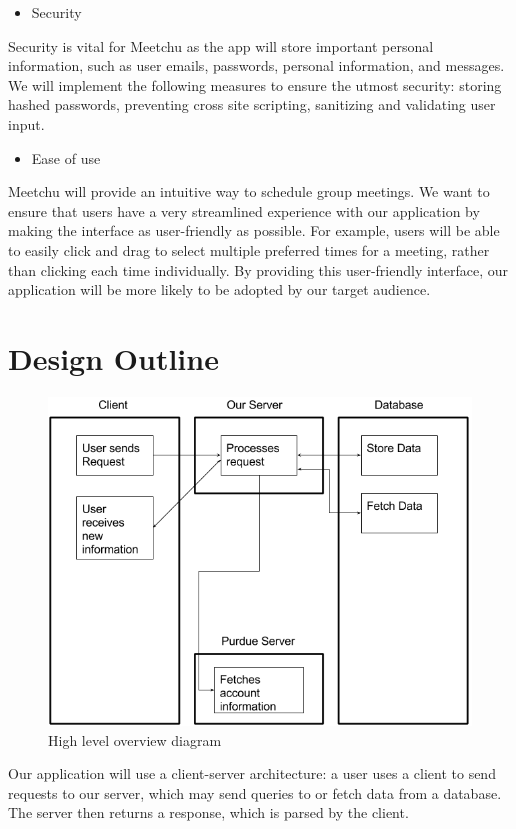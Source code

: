 \documentclass[12pt]{article}
\begin{document}
\begin{itemize}
\item Security
\end{itemize}

Security is vital for Meetchu as the app will store important personal information, such as user emails, passwords, personal information, and messages. We will implement the following measures to ensure the utmost security: storing hashed
passwords, preventing cross site scripting, sanitizing and validating user input.

\begin{itemize}
\item Ease of use
\end{itemize}

Meetchu will provide an intuitive way to schedule group meetings. We want to
ensure that users have a very streamlined experience with our application by making the interface as user-friendly as possible. For example, users will be able to easily click and drag to select multiple preferred times for a meeting, rather than clicking each time individually. By providing this user-friendly interface, our application will be more likely to be adopted by our target audience.

\newpage

\section{Design Outline}

\begin{figure}[H]
\centering
\includegraphics[width=.5\textwidth]{client-server-database}
\caption{High level overview diagram}
\end{figure}

Our application will use a client-server architecture: a user uses a client to send requests to our server, which may send queries to or fetch data from a database. The server then returns a response, which is parsed by the client.
\end{document}
